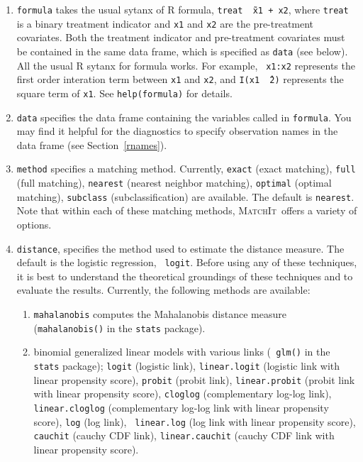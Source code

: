 \documentclass[oneside,letterpaper,titlepage]{article}
\newcommand{\MatchIt}{\textsc{MatchIt}}
\begin{document}
\begin{enumerate}
  
\item \texttt{formula} takes the usual sytanx of R formula, {\tt treat
    \~\ x1 + x2}, where {\tt treat} is a binary treatment indicator
  and {\tt x1} and {\tt x2} are the pre-treatment covariates. Both the
  treatment indicator and pre-treatment covariates must be contained
  in the same data frame, which is specified as {\tt data} (see
  below).  All the usual R sytanx for formula works. For example, {\tt
    x1:x2} represents the first order interation term between {\tt x1}
  and {\tt x2}, and {\tt I(x1 \^\ 2)} represents the square term of
  {\tt x1}. See {\tt help(formula)} for details.
  
\item \texttt{data} specifies the data frame containing the variables
  called in {\tt formula}.  You may find it helpful for the
  diagnostics to specify observation names in the data frame (see
  Section~\ref{rnames}).
  
\item \texttt{method} specifies a matching method. Currently,
  \texttt{exact} (exact matching), \texttt{full} (full matching),
  \texttt{nearest} (nearest neighbor matching), \texttt{optimal}
  (optimal matching), \texttt{subclass} (subclassification) are
  available. The default is \texttt{nearest}. Note that within each of
  these matching methods, \MatchIt\, offers a variety of options.
  
\item \texttt{distance}, specifies the method used to estimate the
  distance measure. The default is the logistic regression, {\tt
    logit}. Before using any of these techniques, it is best to
  understand the theoretical groundings of these techniques and to
  evaluate the results. Currently, the following methods are
  available:
  \begin{enumerate}
  \item {\tt mahalanobis} computes the Mahalanobis distance measure
    ({\tt mahalanobis()} in the {\tt stats} package).
  \item binomial generalized linear models with various links ({\tt
      glm()} in the {\tt stats} package); \texttt{logit} (logistic
    link), {\tt linear.logit} (logistic link with linear propensity
    score), \texttt{probit} (probit link), {\tt linear.probit} (probit
    link with linear propensity score), {\tt cloglog} (complementary
    log-log link), {\tt linear.cloglog} (complementary log-log link
    with linear propensity score), {\tt log} (log link), {\tt
      linear.log} (log link with linear propensity score), {\tt
      cauchit} (cauchy CDF link), {\tt linear.cauchit} (cauchy CDF
    link with linear propensity score).


\end{enumerate}
\end{enumerate}
\end{document}
